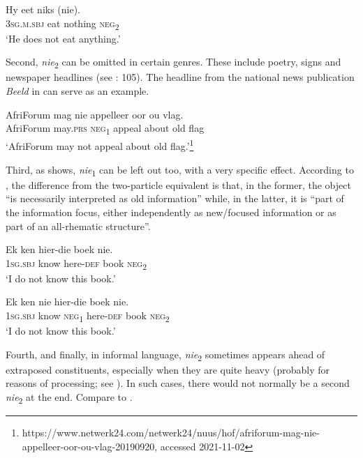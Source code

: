 \documentclass[output=paper,colorlinks,citecolor=brown]{langscibook}
\begin{document}
    \ex\label{ex:afr:6d}
        \gll Hy eet niks (nie). \\
             3\textsc{sg.m.sbj} eat nothing \textsc{neg}\textsubscript{2}\\
        \glt ‘He does not eat anything.’
    \z
\z 


Second, \textit{nie}\textsubscript{2} can be omitted in certain genres. These include poetry, signs and newspaper headlines (see \citealt{Deumert2017}: 105). The headline from the national news publication \textit{Beeld} in  can serve as an example.

\ea\label{ex:afr:7}
    \gll AfriForum mag nie appelleer oor ou vlag. \\ 
         AfriForum may.\textsc{prs} \textsc{neg}\textsubscript{1} appeal about old flag \\
    \glt ‘AfriForum may not appeal about old flag.’\footnote{https://www.netwerk24.com/netwerk24/nuus/hof/afriforum-mag-nie-appelleer-oor-ou-vlag-20190920, accessed 2021-11-02} 
\z 

Third, as  shows, \textit{nie}\textsubscript{1} can be left out too, with a very specific effect. According to \citet[5]{Biberauer2007}, the difference from the two-particle equivalent  is that, in the former, the object “is necessarily interpreted as old information” while, in the latter, it is “part of the information focus, either independently as new/focused information or as part of an all-rhematic structure”.

\ea\label{ex:afr:8}
    \ea\label{ex:afr:8a}
        \gll Ek ken hier-die boek nie. \\ 
             \textsc{1sg.sbj} know  here-\textsc{def} book \textsc{neg}\textsubscript{2} \\
        \glt ‘I do not know this book.’
    
    \ex\label{ex:afr:8b}
        \gll Ek ken  nie  hier-die    boek  nie. \\
             \textsc{1sg.sbj} know \textsc{neg}\textsubscript{1} here-\textsc{def} book  \textsc{neg}\textsubscript{2} \\
        \glt ‘I do not know this book.’
    
    \z
\z 

Fourth, and finally, in informal language, \textit{nie}\textsubscript{2} sometimes appears ahead of extraposed constituents, especially when they are quite heavy (probably for reasons of processing; see \citealt[117]{Molnárfi2001}). In such cases, there would not normally be a second \textit{nie}\textsubscript{2} at the end. Compare  to .
\end{document}
